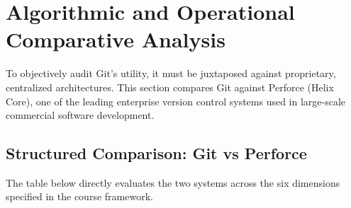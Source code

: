 \section{Algorithmic and Operational Comparative Analysis}

To objectively audit Git's utility, it must be juxtaposed against proprietary, centralized
architectures. This section compares Git against Perforce (Helix Core), one of the leading
enterprise version control systems used in large-scale commercial software development.

\subsection{Structured Comparison: Git vs Perforce}

The table below directly evaluates the two systems across the six dimensions specified in
the course framework.

